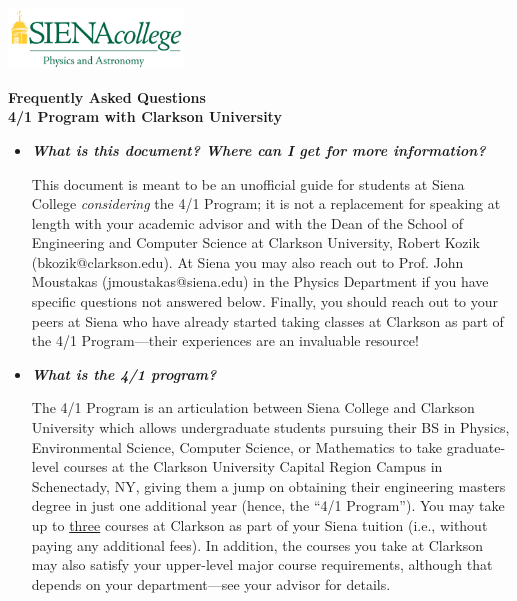 \documentclass[12pt]{article}
\begin{document}
\hfill \includegraphics[width=0.35\textwidth]{siena_phys_astro_print_crop.jpg}

\vspace{0.2cm}
\begin{center}
{\LARGE {\bf Frequently Asked Questions}} \\
\medskip
{\Large {\bf 4/1 Program with Clarkson University}} 
\end{center}
\vspace{0.3cm}


\begin{itemize}
\item{{\bf {\em What is this document? Where can I get for more information?}} 

This document is meant to be an unofficial guide for students at Siena College
\emph{considering} the 4/1 Program; it is not a replacement for speaking at
length with your academic advisor and with the Dean of the School of Engineering
and Computer Science at Clarkson University, Robert Kozik (bkozik@clarkson.edu).
At Siena you may also reach out to Prof. John Moustakas (jmoustakas@siena.edu)
in the Physics Department if you have specific questions not answered below.
Finally, you should reach out to your peers at Siena who have already started
taking classes at Clarkson as part of the 4/1 Program---their experiences are an
invaluable resource!}

\item{{\bf {\em What is the 4/1 program?}}

The 4/1 Program is an articulation between Siena College and Clarkson University
which allows undergraduate students pursuing their BS in Physics, Environmental
Science, Computer Science, or Mathematics to take graduate-level courses at the
Clarkson University Capital Region Campus in Schenectady, NY, giving them a jump
on obtaining their engineering masters degree in just one additional year
(hence, the ``4/1 Program'').  You may take up to \underline{three} courses at
Clarkson as part of your Siena tuition (i.e., without paying any additional
fees).  In addition, the courses you take at Clarkson may also satisfy your
upper-level major course requirements, although that depends on your
department---see your advisor for details.}


\end{itemize}
\end{document}
